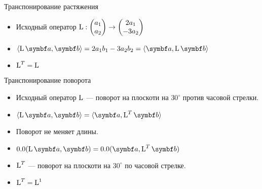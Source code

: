 \begin{frame}{Транспонирование растяжения}


\begin{itemize}[<+->]
    \item 
Исходный оператор $\operatorname{L} : \begin{pmatrix}
  a_1 \\
  a_2 \\
\end{pmatrix} \to
\begin{pmatrix}
  2a_1 \\
  -3a_2 \\
\end{pmatrix}
$

\item 
$\langle \LL \ba , \bb \rangle = 2a_1 b_1 - 3a_2 b_2 = \langle  \ba , \LL \bb \rangle$

\item $\operatorname{L}^T = \operatorname{L}$

\end{itemize}

\end{frame}




\begin{frame}{Транспонирование поворота}


\begin{itemize}[<+->]
    \item 
Исходный оператор $\operatorname{L}$ — поворот на плоскоти на $30^{\circ}$ против часовой стрелки.

\item $\langle \LL \ba , \bb \rangle = \langle \ba , \LL^T \bb \rangle$

\item Поворот не меняет длины. 

\item $\angle (\LL \ba , \bb ) = \angle (\ba , \LL^T \bb)$

\item $\operatorname{L}^T$  — поворот на плоскоти на $30^{\circ}$ по часовой стрелке.

\item $\operatorname{L}^T=\operatorname{L}^{1}$

\end{itemize}

\end{frame}
    


